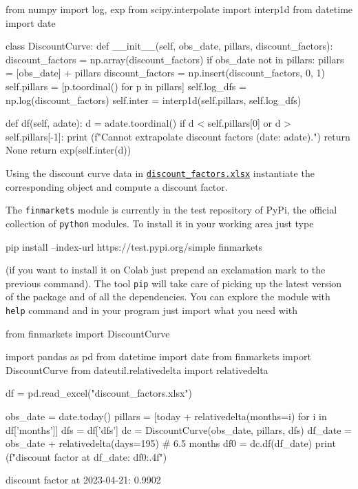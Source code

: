 \begin{ipython}
from numpy import log, exp
from scipy.interpolate import interp1d
from datetime import date

class DiscountCurve:
    def __init__(self, obs_date, pillars, discount_factors):
    	discount_factors = np.array(discount_factors)
        if obs_date not in pillars:
            pillars = [obs_date] + pillars
            discount_factors = np.insert(discount_factors, 0, 1)
        self.pillars = [p.toordinal() for p in pillars]
        self.log_dfs = np.log(discount_factors)
        self.inter = interp1d(self.pillars, self.log_dfs)
        
    def df(self, adate):
        d = adate.toordinal()
        if d < self.pillars[0] or d > self.pillars[-1]:
            print (f"Cannot extrapolate discount factors (date: {adate}).")
            return None
        return exp(self.inter(d))
\end{ipython}

Using the discount curve data in \href{https://github.com/matteosan1/finance_course/raw/master/input_files/discount_factors_2022-10-05.xlsx}{\texttt{discount\_factors.xlsx}} instantiate the corresponding object and compute a discount factor.

\begin{finmarkets}
The \texttt{finmarkets} module is currently in the test repository of PyPi, the official collection of \texttt{python} modules. 
To install it in your working area just type 

\begin{ioutput}
pip install --index-url https://test.pypi.org/simple finmarkets
\end{ioutput}

(if you want to install it on Colab just prepend an exclamation mark to the previous command). The tool \texttt{pip} will take care of picking up the latest version of the package and of all the dependencies. You can explore the module with \texttt{help} command and in your program just import what you need with

\begin{ipython}
from finmarkets import DiscountCurve
\end{ipython}
\end{finmarkets}

\begin{ipython}
import pandas as pd
from datetime import date
from finmarkets import DiscountCurve
from dateutil.relativedelta import relativedelta

df = pd.read_excel("discount_factors.xlsx")

obs_date = date.today()
pillars = [today + relativedelta(months=i) for i in df['months']]
dfs = df['dfs']
dc = DiscountCurve(obs_date, pillars, dfs)
df_date = obs_date + relativedelta(days=195) # 6.5 months
df0 = dc.df(df_date)
print (f"discount factor at {df_date}: {df0:.4f}")
\end{ipython}
\begin{ioutput}
discount factor at 2023-04-21: 0.9902
\end{ioutput}

